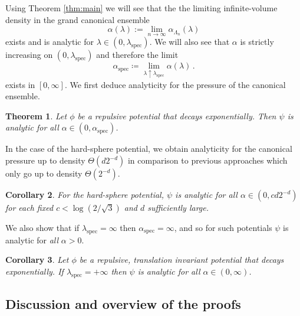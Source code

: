 \documentclass[10pt]{amsart}
\newtheorem{theorem}{Theorem}[section]
\newtheorem{corollary}[theorem]{Corollary}
\theoremstyle{definition}
\theoremstyle{remark}
\newcommand{\spec}{{\mathrm{spec}}}
\begin{document}
	Using Theorem \ref{thm:main} we will see that the the limiting infinite-volume density in the grand canonical ensemble $$\alpha(\lambda):= \lim_{n \to \infty} \alpha_{\Lambda_n}(\lambda)
	$$
	exists and is analytic for $\lambda \in (0,\lambda_\spec)$.  
	We will also see that $\alpha$ is strictly increasing on $(0,\lambda_\spec)$ and therefore the limit
	\[
	\alpha_{\spec}
	\coloneqq
	\lim_{\lambda\uparrow\lambda_{\spec}}\alpha(\lambda)\, .
	\]
	exists in \([0,\infty]\).  We first deduce analyticity for the pressure of the canonical ensemble. 
	
	
	\begin{theorem}\label{thm:analyticity-canonical}
		Let $\phi$ be a repulsive potential that decays exponentially.  Then $\psi$ is analytic for all $\alpha \in (0,\alpha_\spec)$.
	\end{theorem}
	
	
	In the case of the hard-sphere potential, we obtain analyticity for the canonical pressure up to density $\Theta(d2^{-d})$ in comparison to previous approaches which only go up to density $\Theta(2^{-d})$. 
	
	\begin{corollary}\label{cor:canon-hs}
		For the hard-sphere potential, $\psi$ is analytic for all $\alpha \in (0,cd2^{-d})$ for each fixed $c<\log(2/\sqrt{3})$ and $d$ sufficiently large. 
	\end{corollary}
	
	
	
	
	We also show that if $\lambda_\spec=\infty$ then $\alpha_\spec=\infty$, and so for such potentials $\psi$ is analytic for \emph{all} $\alpha>0$.
	
	\begin{corollary}\label{cor:canon-pd}
		Let $\phi$ be a repulsive, translation invariant potential that decays exponentially. If $\lambda_\spec=+\infty$ then $\psi$ is analytic for all $\alpha\in (0,\infty)$.
	\end{corollary}
	
	
	\subsection{Discussion and overview of the proofs}
	
\end{document}
